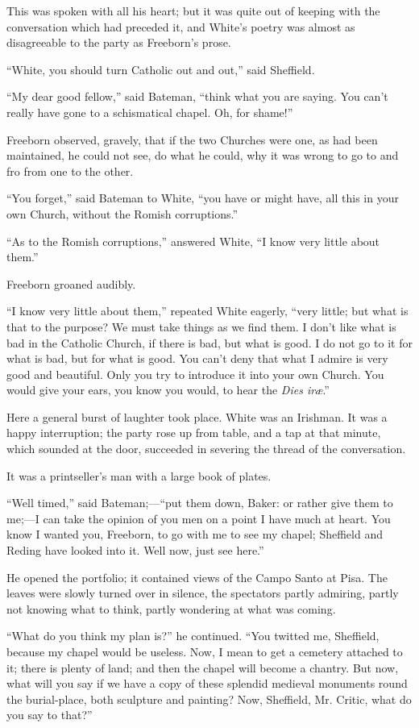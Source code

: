 This was spoken with all his heart; but it was quite out of keeping
with the conversation which had preceded it, and White's poetry was
almost as disagreeable to the party as Freeborn's prose.

``White, you should turn Catholic out and out,'' said
Sheffield.

``My dear good fellow,'' said Bateman, ``think what you
are saying. You can't really have gone to a schismatical chapel. Oh,
for shame!''

Freeborn observed, gravely, that if the two Churches were one, as
had been maintained, he could not see, do what he could, why it was
wrong to go to and fro from one to the other.

``You forget,'' said Bateman to White, ``you have or
might have, all this in your own Church, without the Romish
corruptions.''

``As to the Romish corruptions,'' answered White, ``I
know very little about them.''

Freeborn groaned audibly.

``I know very little about them,'' repeated White eagerly,
``very little; but what is that to the purpose? We must take
things as we find them. I don't like what is bad in the Catholic
Church, if there is bad, but what is good. I do not go to it for what
is bad, but for what is good. You can't deny that what I admire is
very good and beautiful. Only you try to introduce it into your own
Church. You would give your ears, you know you would, to hear the \emph{Dies
iræ}.''

Here a general burst of laughter took place. White was an Irishman.
It was a happy interruption; the party rose up from table, and a tap
at that minute, which sounded at the door, succeeded in severing the
thread of the conversation.

It was a printseller's man with a large book of plates.

``Well timed,'' said Bateman;—``put them down, Baker:
or rather give them to me;—I can take the opinion of you men on a
point I have much at heart. You know I wanted you, Freeborn, to go
with me to see my chapel; Sheffield and Reding have looked into it.
Well now, just see here.''

He opened the portfolio; it contained views of the Campo Santo at
Pisa. The leaves were slowly turned over in silence, the spectators
partly admiring, partly not knowing what to think, partly wondering at
what was coming.

``What do you think my plan is?'' he continued. ``You
twitted me, Sheffield, because my chapel would be useless. Now, I mean
to get a cemetery attached to it; there is plenty of land; and then
the chapel will become a chantry. But now, what will you say if
we have a copy of these splendid medieval monuments round the
burial-place, both sculpture and painting? Now, Sheffield, Mr. Critic,
what do you say to that?''

